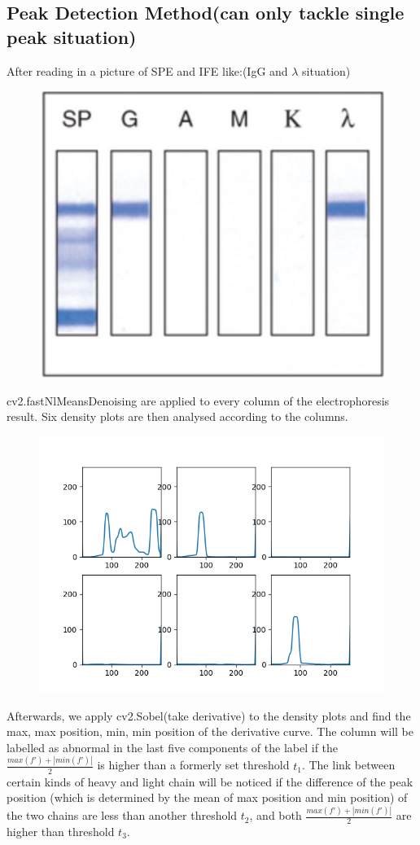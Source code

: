 \documentclass[12pt]{ctexart}
\begin{document}
\subsection{Peak Detection Method(can only tackle single peak situation)}
\par After reading in a picture of SPE and IFE like:(IgG and $\lambda$ situation)
\begin{figure}[H]
    \centering
    \includegraphics[width=0.5\linewidth]{gl.jpg}
\end{figure}
cv2.fastNlMeansDenoising are applied to every column of the electrophoresis result. Six density plots are then analysed according to the columns.
\begin{figure}[H]
    \centering
    \includegraphics[width=0.5\linewidth]{IgG-lambda.png}
\end{figure}
Afterwards, we apply cv2.Sobel(take derivative) to the density plots and find the max, max position, min, min position of the derivative curve. The column will be labelled as abnormal in the last five components of the label if the $\frac{max(f')+|min(f')|}{2}$ is higher than a formerly set threshold $t_1$. The link between certain kinds of heavy and light chain will be noticed if the difference of the peak position (which is determined by the mean of max position and min position) of the two chains are less than another threshold $t_2$, and both $\frac{max(f')+|min(f')|}{2}$ are higher than threshold $t_3$.
\end{document}
